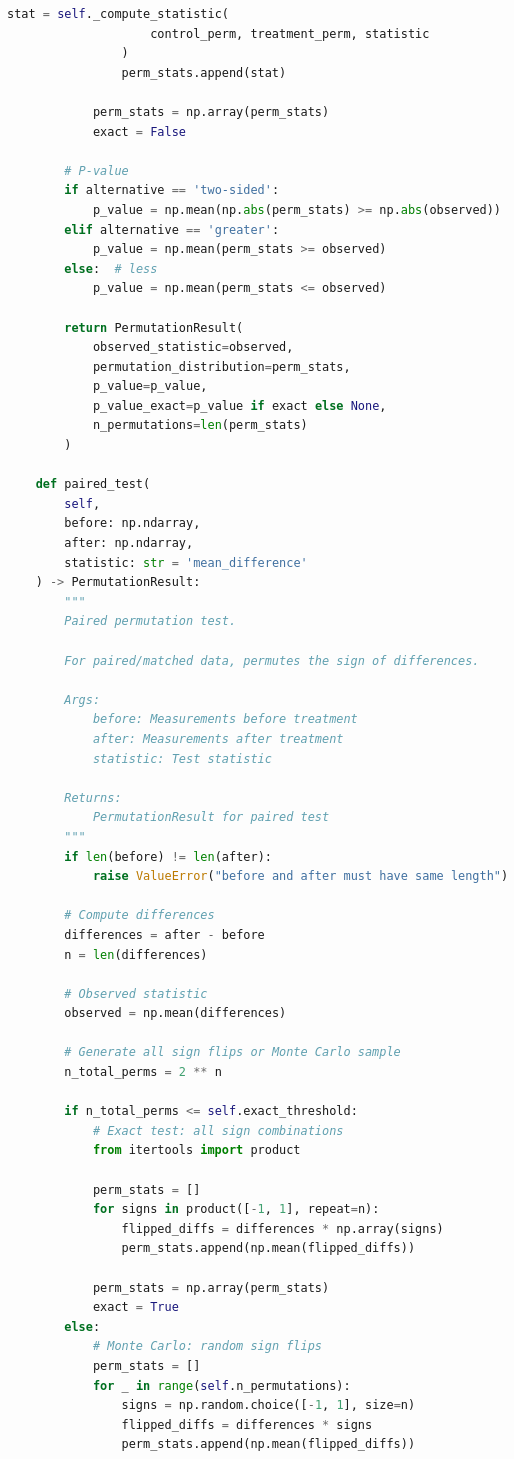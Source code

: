 \begin{lstlisting}[language=Python, caption={Permutation Hypothesis Testing}]
                stat = self._compute_statistic(
                    control_perm, treatment_perm, statistic
                )
                perm_stats.append(stat)

            perm_stats = np.array(perm_stats)
            exact = False

        # P-value
        if alternative == 'two-sided':
            p_value = np.mean(np.abs(perm_stats) >= np.abs(observed))
        elif alternative == 'greater':
            p_value = np.mean(perm_stats >= observed)
        else:  # less
            p_value = np.mean(perm_stats <= observed)

        return PermutationResult(
            observed_statistic=observed,
            permutation_distribution=perm_stats,
            p_value=p_value,
            p_value_exact=p_value if exact else None,
            n_permutations=len(perm_stats)
        )

    def paired_test(
        self,
        before: np.ndarray,
        after: np.ndarray,
        statistic: str = 'mean_difference'
    ) -> PermutationResult:
        """
        Paired permutation test.

        For paired/matched data, permutes the sign of differences.

        Args:
            before: Measurements before treatment
            after: Measurements after treatment
            statistic: Test statistic

        Returns:
            PermutationResult for paired test
        """
        if len(before) != len(after):
            raise ValueError("before and after must have same length")

        # Compute differences
        differences = after - before
        n = len(differences)

        # Observed statistic
        observed = np.mean(differences)

        # Generate all sign flips or Monte Carlo sample
        n_total_perms = 2 ** n

        if n_total_perms <= self.exact_threshold:
            # Exact test: all sign combinations
            from itertools import product

            perm_stats = []
            for signs in product([-1, 1], repeat=n):
                flipped_diffs = differences * np.array(signs)
                perm_stats.append(np.mean(flipped_diffs))

            perm_stats = np.array(perm_stats)
            exact = True
        else:
            # Monte Carlo: random sign flips
            perm_stats = []
            for _ in range(self.n_permutations):
                signs = np.random.choice([-1, 1], size=n)
                flipped_diffs = differences * signs
                perm_stats.append(np.mean(flipped_diffs))


\end{lstlisting}
